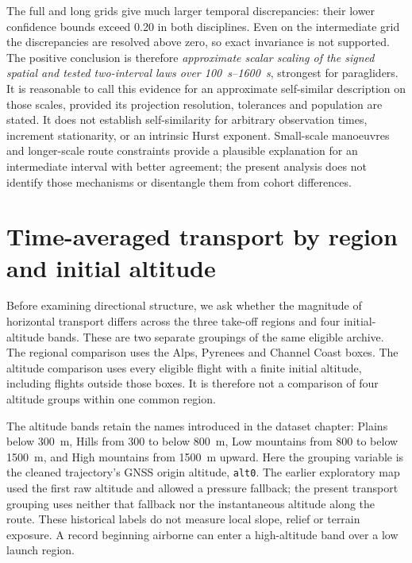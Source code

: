 The full and long grids give much larger temporal discrepancies: their lower
confidence bounds exceed 0.20 in both disciplines. Even on the intermediate
grid the discrepancies are resolved above zero, so exact invariance is not
supported. The positive conclusion is therefore \emph{approximate scalar
scaling of the signed spatial and tested two-interval laws over
\SIrange{100}{1600}{\second}}, strongest for paragliders. It is reasonable to
call this evidence for an approximate self-similar description on those scales,
provided its projection resolution, tolerances and population are stated.
It does not establish self-similarity for arbitrary observation times, increment
stationarity, or an intrinsic Hurst exponent. Small-scale manoeuvres and
longer-scale route constraints provide a plausible explanation for an
intermediate interval with better agreement; the present analysis does not
identify those mechanisms or disentangle them from cohort differences.
\FloatBarrier
\section{Time-averaged transport by region and initial altitude}
\label{sec:grouped-tamsd}

Before examining directional structure, we ask whether the magnitude of horizontal
transport differs across the three take-off regions and four initial-altitude bands.
These are two separate groupings of the same eligible archive. The regional comparison
uses the Alps, Pyrenees and Channel Coast boxes. The altitude comparison uses every
eligible flight with a finite initial altitude, including flights outside those boxes.
It is therefore not a comparison of four altitude groups within one common region.

The altitude bands retain the names introduced in the dataset chapter:
Plains below \SI{300}{\metre}, Hills from 300 to below \SI{800}{\metre},
Low mountains from 800 to below \SI{1500}{\metre}, and High mountains from
\SI{1500}{\metre} upward. Here the grouping variable is the cleaned trajectory's
GNSS origin altitude, \texttt{alt0}. The earlier exploratory map used the first raw
altitude and allowed a pressure fallback; the present transport grouping uses neither
that fallback nor the instantaneous altitude along the route. These historical labels
do not measure local slope, relief or terrain exposure. A record beginning airborne
can enter a high-altitude band over a low launch region.

